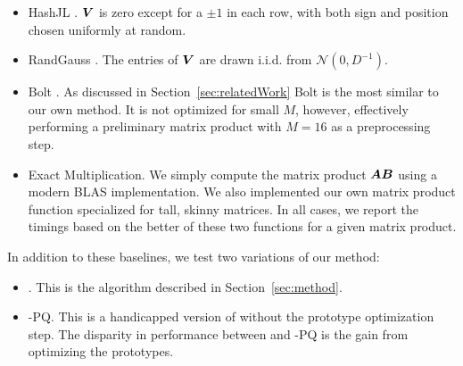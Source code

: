 \begin{itemize}
    \item HashJL \cite{hashjl}. $\bm{V}$ is zero except for a $\pm 1$ in each row, with both sign and position chosen uniformly at random.
    \item RandGauss \cite{lshOrig,E2LSH}. The entries of $\bm{V}$ are drawn i.i.d. from $\mathcal{N}(0, D^{-1})$.
    \item Bolt \cite{bolt}. As discussed in Section~\ref{sec:relatedWork} Bolt is the most similar to our own method. It is not optimized for small $M$, however, effectively performing a preliminary matrix product with $M=16$ as a preprocessing step.
    \item Exact Multiplication. We simply compute the matrix product $\bm{A}\bm{B}$ using a modern BLAS implementation. We also implemented our own matrix product function specialized for tall, skinny matrices. In all cases, we report the timings based on the better of these two functions for a given matrix product.
\end{itemize}

In addition to these baselines, we test two variations of our method:
\begin{itemize}
    \item \ours. This is the algorithm described in Section~\ref{sec:method}.
    \item \ours-PQ. This is a handicapped version of \oursp without the prototype optimization step. The disparity in performance between \oursp and \ours-PQ is the gain from optimizing the prototypes.
\end{itemize}

